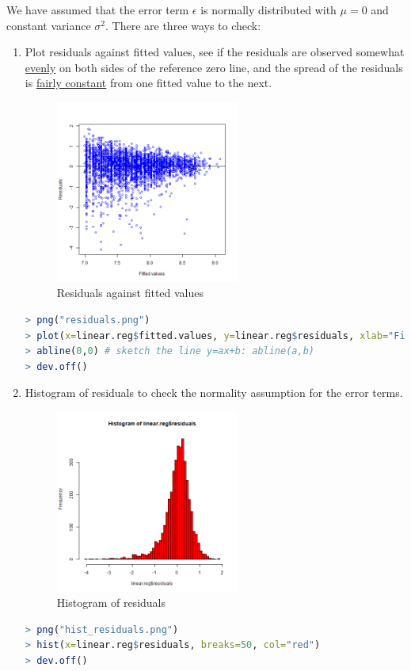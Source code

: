 \documentclass{article}
\begin{document}
We have assumed that the error term $\epsilon$ is normally distributed with $\mu =0$ and constant variance $\sigma^2$. There are three ways to check:
\begin{enumerate}
\item Plot residuals against fitted values, see if the residuals are observed somewhat \underline{evenly} on both sides of the reference zero line, and the spread of the residuals is \underline{fairly constant} from one fitted value to the next.
\begin{figure}[H]
    \centering
    \includegraphics[width=6cm]{images/residuals2.png}
    \caption{Residuals against fitted values}
\end{figure}
\begin{lstlisting}[language=R]
> png("residuals.png")
> plot(x=linear.reg$fitted.values, y=linear.reg$residuals, xlab="Fitted values", ylab="Residuals", col="red")
> abline(0,0) # sketch the line y=ax+b: abline(a,b)
> dev.off()
\end{lstlisting}

\item Histogram of residuals to check the normality assumption for the error terms.
\begin{figure}[H]
    \centering
    \includegraphics[width=6cm]{images/hist_residuals.png}
    \caption{Histogram of residuals}
\end{figure}
\begin{lstlisting}[language=R]
> png("hist_residuals.png")
> hist(x=linear.reg$residuals, breaks=50, col="red")
> dev.off()
\end{lstlisting}


\end{enumerate}
\end{document}
